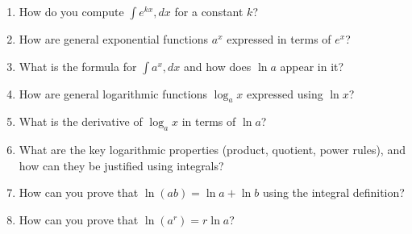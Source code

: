 \begin{enumerate}
\item How do you compute $\int e^{kx},dx$ for a constant $k$?

\item How are general exponential functions $a^x$ expressed in terms of $e^x$?

\item What is the formula for $\int a^x,dx$ and how does $\ln a$ appear in it?

\item How are general logarithmic functions $\log_a x$ expressed using $\ln x$?

\item What is the derivative of $\log_a x$ in terms of $\ln a$?

\item What are the key logarithmic properties (product, quotient, power rules), and how can they be justified using integrals?

\item How can you prove that $\ln(ab) = \ln a + \ln b$ using the integral definition?

\item How can you prove that $\ln(a^r) = r \ln a$?

\end{enumerate}
